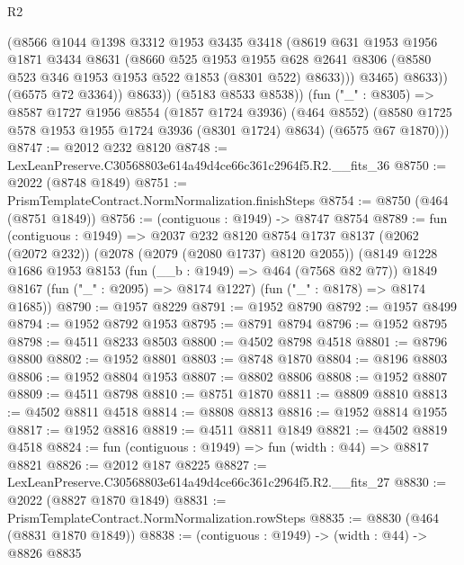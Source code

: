 \begin{lexlean}{R2}
\begin{coremodule}
                  (@8566
                    @1044
                    @1398
                    @3312
                    @1953
                    @3435
                    @3418
                    (@8619
                      @631
                      @1953
                      @1956
                      @1871
                      @3434
                      @8631
                      (@8660
                        @525
                        @1953
                        @1955
                        @628
                        @2641
                        @8306
                        (@8580 @523 @346 @1953 @1953 @522 @1853 (@8301 @522) @8633)))
                    @3465)
                  @8633))
              (@6575 @72 @3364))
            @8633))
        (@5183 @8533 @8538))
      (fun ("_" : @8305) =>
      @8587
        @1727
        @1956
        @8554
        (@1857 @1724 @3936)
        (@464 @8552)
        (@8580 @1725 @578 @1953 @1955 @1724 @3936 (@8301 @1724) @8634)
        (@6575 @67 @1870)))
@8747 := @2012 @232 @8120
@8748 := LexLeanPreserve.C30568803e614a49d4ce66c361c2964f5.R2.__fits_36
@8750 := @2022 (@8748 @1849)
@8751 := PrismTemplateContract.NormNormalization.finishSteps
@8754 := @8750 (@464 (@8751 @1849))
@8756 := (contiguous : @1949) -> @8747 @8754
@8789 := fun (contiguous : @1949) =>
  @2037
    @232
    @8120
    @8754
    @1737
    @8137
    (@2062 (@2072 @232))
    (@2078 (@2079 (@2080 @1737) @8120 @2055))
    (@8149
      @1228
      @1686
      @1953
      @8153
      (fun (__b : @1949) => @464 (@7568 @82 @77))
      @1849
      @8167
      (fun ("_" : @2095) => @8174 @1227)
      (fun ("_" : @8178) => @8174 @1685))
@8790 := @1957 @8229
@8791 := @1952 @8790
@8792 := @1957 @8499
@8794 := @1952 @8792 @1953
@8795 := @8791 @8794
@8796 := @1952 @8795
@8798 := @4511 @8233 @8503
@8800 := @4502 @8798 @4518
@8801 := @8796 @8800
@8802 := @1952 @8801
@8803 := @8748 @1870
@8804 := @8196 @8803
@8806 := @1952 @8804 @1953
@8807 := @8802 @8806
@8808 := @1952 @8807
@8809 := @4511 @8798
@8810 := @8751 @1870
@8811 := @8809 @8810
@8813 := @4502 @8811 @4518
@8814 := @8808 @8813
@8816 := @1952 @8814 @1955
@8817 := @1952 @8816
@8819 := @4511 @8811 @1849
@8821 := @4502 @8819 @4518
@8824 := fun (contiguous : @1949) => fun (width : @44) => @8817 @8821
@8826 := @2012 @187 @8225
@8827 := LexLeanPreserve.C30568803e614a49d4ce66c361c2964f5.R2.__fits_27
@8830 := @2022 (@8827 @1870 @1849)
@8831 := PrismTemplateContract.NormNormalization.rowSteps
@8835 := @8830 (@464 (@8831 @1870 @1849))
@8838 := (contiguous : @1949) -> (width : @44) -> @8826 @8835

\end{coremodule}
\end{lexlean}
